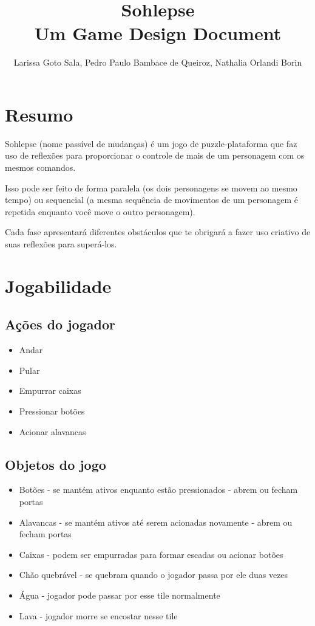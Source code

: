 \documentclass[a4paper, 11pt]{article}
\title{\textbf{Sohlepse} \\ \small{Um Game Design Document}}
\author{Larissa Goto Sala, Pedro Paulo Bambace de Queiroz, Nathalia Orlandi Borin}
\begin{document}
\maketitle

\newpage

\newpage

\section{Resumo}
	
	Sohlepse (nome passível de mudanças) é um jogo de puzzle-plataforma que faz uso de reflexões para proporcionar o controle de mais de um personagem com os mesmos comandos.

Isso pode ser feito de forma paralela (os dois personagens se movem ao mesmo tempo) ou sequencial (a mesma sequência de movimentos de um personagem é repetida enquanto você move o outro personagem).

Cada fase apresentará diferentes obstáculos que te obrigará a fazer uso criativo de suas reflexões para superá-los.

\section{Jogabilidade}

	\subsection{Ações do jogador}
		\begin{itemize}
			\item Andar 
			\item Pular 
			\item Empurrar caixas 
			\item Pressionar botões
			\item Acionar alavancas 
		\end{itemize}

	\subsection{Objetos do jogo}
		\begin{itemize}
			\item Botões - se mantém ativos enquanto estão pressionados - abrem ou fecham portas
			\item Alavancas - se mantém ativos até serem acionadas novamente - abrem ou fecham portas
			\item Caixas - podem ser empurradas para formar escadas ou acionar botões
			\item Chão quebrável - se quebram quando o jogador passa por ele duas vezes
			\item Água - jogador pode passar por esse tile normalmente
			\item Lava - jogador morre se encostar nesse tile
		\end{itemize}
\end{document}
